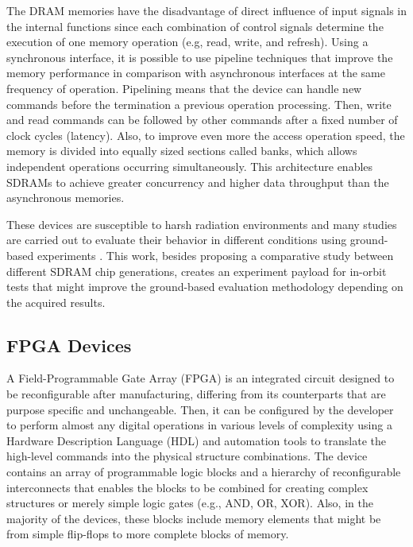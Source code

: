 The DRAM memories have the disadvantage of direct influence of input signals in the internal functions since each combination of control signals determine the execution of one memory operation (e.g, read, write, and refresh). Using a synchronous interface, it is possible to use pipeline techniques that improve the memory performance in comparison with asynchronous interfaces at the same frequency of operation. Pipelining means that the device can handle new commands before the termination a previous operation processing. Then, write and read commands can be followed by other commands after a fixed number of clock cycles (latency). Also, to improve even more the access operation speed, the memory is divided into equally sized sections called banks, which allows independent operations occurring simultaneously. This architecture enables SDRAMs to achieve greater concurrency and higher data throughput than the asynchronous memories.

These devices are susceptible to harsh radiation environments and many studies are carried out to evaluate their behavior in different conditions using ground-based experiments \cite{memory_tests_lucas}. This work, besides proposing a comparative study between different SDRAM chip generations, creates an experiment payload for in-orbit tests that might improve the ground-based evaluation methodology depending on the acquired results.


\subsection{FPGA Devices}

A Field-Programmable Gate Array (FPGA) is an integrated circuit designed to be reconfigurable after manufacturing, differing from its counterparts that are purpose specific and unchangeable. Then, it can be configured by the developer to perform almost any digital operations in various levels of complexity using a Hardware Description Language (HDL) and automation tools to translate the high-level commands into the physical structure combinations. The device contains an array of programmable logic blocks and a hierarchy of reconfigurable interconnects that enables the blocks to be combined for creating complex structures or merely simple logic gates (e.g., AND, OR, XOR). Also, in the majority of the devices, these blocks include memory elements that might be from simple flip-flops to more complete blocks of memory.

